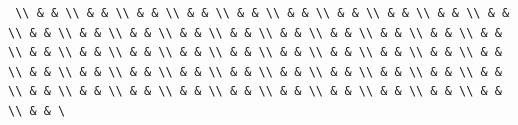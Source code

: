 \documentclass[
  ukrainian,
]{article}
\begin{document}
\begin{verbatim}
 \\ & & \\ & & \\ & & \\ & & \\ & & \\ & & \\ & & \\ & & \\ & & \\ & & \\ & & \\ & & \\ & & \\ & & \\ & & \\ & & \\ & & \\ & & \\ & & \\ & & \\ & & \\ & & \\ & & \\ & & \\ & & \\ & & \\ & & \\ & & \\ & & \\ & & \\ & & \\ & & \\ & & \\ & & \\ & & \\ & & \\ & & \\ & & \\ & & \\ & & \\ & & \\ & & \\ & & \\ & & \\ & & \\ & & \\ & & \\ & & \\ & & \\ & & \\ & & \
\end{verbatim}
\end{document}
